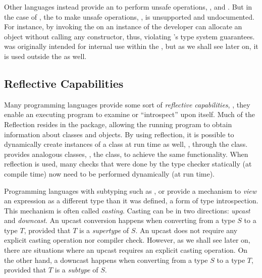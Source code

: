 Other languages instead provide an \api{} to perform unsafe operations,
\eg{}, \haskell{}%
and \java{}.
But in the case of \java{}, the \api{} to make unsafe operations,
\smu{}, is unsupported%
and undocumented.
For instance,
by invoking the  on an instance of \smu{}
the developer can allocate an object without calling any constructor,
thus, violating \java{}'s type system guarantees.
\smu{} was originally intended for internal use within the \jdk{},
but as we shall see later on, it is used outside the \jdk{} as well.

\subsection*{Reflective Capabilities}

Many programming languages provide some sort of \emph{reflective capabilities},
\ie{}, they enable an executing program to examine or ``introspect'' upon itself.
Much of the \java{} Reflection \api{} resides in the  package,
allowing the running program to obtain information about classes and objects.
By using reflection, it is possible to dynamically create instances of a class at run time as well, \eg{}, through the  class.
\csharp{} provides analogous classes, \eg{}, the  class,
to achieve the same functionality.
When reflection is used,
many checks that were done by the type checker statically (at compile time)
now need to be performed dynamically (at run time).

Programming languages with subtyping such as \java{}, \scala{} or \cpp{} provide a mechanism to \emph{view} an expression as a different type than it was defined,
a form of type introspection.
This mechanism is often called \emph{casting}.
Casting can be in two directions: \emph{upcast} and \emph{downcast}.
An upcast conversion happens when converting from a type $S$ to a type $T$, provided that $T$ is a \emph{supertype} of $S$.
An upcast does not require any explicit casting operation nor compiler check.
However, as we shall see later on,
there are situations where an upcast requires an explicit casting operation.
On the other hand,
a downcast happens when converting from a type $S$ to a type $T$,
provided that $T$ is a \emph{subtype} of $S$.

